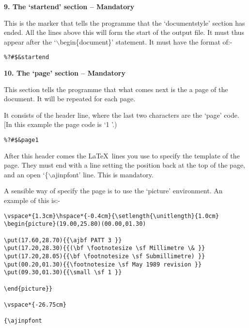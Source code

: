 \vspace*{0.2cm}
{\bf \large 9. The `startend' section -- Mandatory}

\vspace*{0.2cm}

This is the marker that tells the programme that the `documentstyle'
section has ended. All the lines above this will form the start of the
output file. It must thus appear after the `$\backslash$begin\{document\}'
statement. It must have the format of:- 

\begin{verbatim}
%?#$&startend
\end{verbatim}

\vspace*{0.2cm}
{\bf \large 10. The `page' section -- Mandatory}
\vspace*{0.2cm}

This section tells the programme that what comes next is the a page of the
document. It will be repeated for each page. 

It consists of the header line, where the last two characters are the
`page' code. [In this example the page code is `1 '.) 

\begin{verbatim}
%?#$&page1
\end{verbatim}

After this header comes the \LaTeX\ lines you use to specify the template
of the page. They must end with a  line setting the position back at the
top of the page, and an open `\{$\backslash$ajinpfont' line. This is mandatory.

A sensible way of specify the page is to use the `picture' environment. An
example of this is:- 

\begin{verbatim}
\vspace*{1.3cm}\hspace*{-0.4cm}{\setlength{\unitlength}{1.0cm}
\begin{picture}(19.00,25.80)(00.00,01.30)

\put(17.60,28.70){{\ajbf PATT 3 }}
\put(17.20,28.30){{(\bf \footnotesize \sf Millimetre \& }}
\put(17.20,28.05){{\bf \footnotesize \sf Submillimetre) }}
\put(00.20,01.30){{\footnotesize \sf May 1989 revision }}
\put(09.30,01.30){{\small \sf 1 }}

\end{picture}}

\vspace*{-26.75cm}

{\ajinpfont
\end{verbatim}

